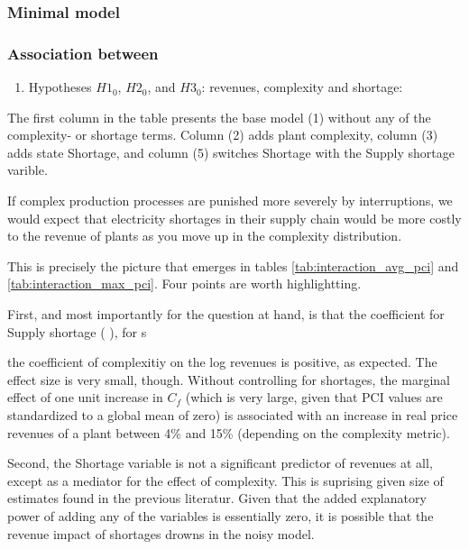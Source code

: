 \documentclass[11pt]{article}
\begin{document}
\subsubsection{Minimal model}%
\label{sub:minimal_model}

\subsubsection{Association between}

\begin{enumerate}

	\item Hypotheses $H1_0$, $H2_0$, and $H3_0$: revenues, complexity and shortage:

\end{enumerate}

The first column in the table presents the base model (1) without any of the complexity- or shortage terms. Column (2) adds plant complexity, column (3) adds state Shortage, and column (5) switches Shortage with the Supply shortage varible.

If complex production processes are punished more severely by interruptions, we would expect that electricity shortages in their supply chain would be more costly to the revenue of plants as you move up in the complexity distribution.

This is precisely the picture that emerges in tables \ref{tab:interaction_avg_pci} and \ref{tab:interaction_max_pci}. Four points are worth highlightting.

First, and most importantly for the question at hand, is that the coefficient for Supply shortage ( ), for s

the coefficient of complexitiy on the log revenues is positive, as expected. The effect size is very small, though. Without controlling for shortages, the marginal effect of one unit increase in $C_{f}$ (which is very large, given that PCI values are standardized to a global mean of zero) is associated with an increase in real price revenues of a plant between 4\% and 15\% (depending on the complexity metric). 

Second, the Shortage variable is not a significant predictor of revenues at all, except as a mediator for the effect of complexity. This is suprising given size of estimates found in the previous literatur. Given that the added explanatory power of adding any of the variables is essentially zero, it is possible that the revenue impact of shortages drowns in the noisy model. 
\end{document}
